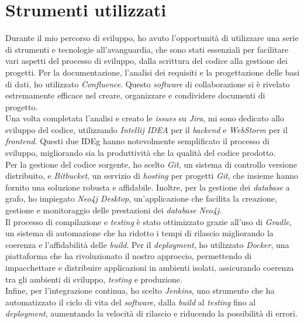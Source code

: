 \section{Strumenti utilizzati}
\noindent Durante il mio percorso di sviluppo, ho avuto l'opportunità di utilizzare una serie di strumenti e tecnologie all'avanguardia, che sono stati essenziali 
per facilitare vari aspetti del processo di sviluppo, dalla scrittura del codice alla gestione dei progetti. 
Per la documentazione, l'analisi dei requisiti e la progettazione delle basi di dati, ho utilizzato \textit{Confluence}. 
Questo \textit{software} di collaborazione si è rivelato estremamente efficace nel creare, organizzare e condividere documenti di progetto.\\

\noindent Una volta completata l'analisi e creato le \textit{issues} su \textit{Jira}, mi sono dedicato allo sviluppo del codice, 
utilizzando \textit{Intellij IDEA} per il \textit{backend} e \textit{WebStorm} per il \textit{frontend}. 
Questi due \gls{IDEg} hanno notevolmente semplificato il processo di sviluppo, migliorando sia la produttività che la qualità del codice prodotto.\\

\noindent Per la gestione del codice sorgente, ho scelto \textit{Git}, un sistema di controllo versione distribuito, e \textit{Bitbucket}, 
un servizio di \textit{hosting} per progetti \textit{Git}, che insieme hanno fornito una soluzione robusta e affidabile. 
Inoltre, per la gestione dei \textit{database} a grafo, ho impiegato \textit{Neo4j Desktop}, un'applicazione che facilita la creazione, gestione e monitoraggio 
delle prestazioni dei \textit{database} \textit{Neo4j}.\\

\noindent Il processo di compilazione e \textit{testing} è stato ottimizzato grazie all'uso di \textit{Gradle}, un sistema di automazione che ha ridotto 
i tempi di rilascio migliorando la coerenza e l'affidabilità delle \textit{build}. Per il \textit{deployment}, ho utilizzato \textit{Docker}, 
una piattaforma che ha rivoluzionato il nostro approccio, permettendo di impacchettare e distribuire applicazioni in ambienti isolati, assicurando 
coerenza tra gli ambienti di sviluppo, \textit{testing} e produzione.\\

\noindent Infine, per l'integrazione continua, ho scelto \textit{Jenkins}, uno strumento che ha automatizzato il ciclo di vita del \textit{software}, 
dalla \textit{build} al \textit{testing} fino al \textit{deployment}, aumentando la velocità di rilascio e riducendo la possibilità di errori. \\

